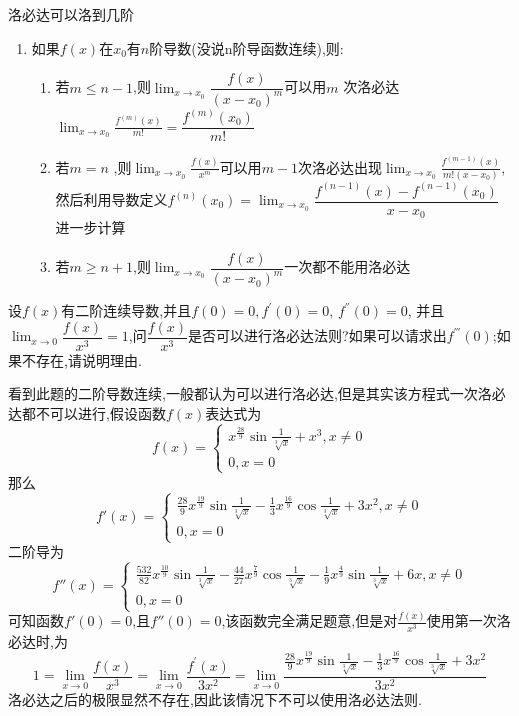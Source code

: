 \documentclass[12pt, a4paper, oneside, UTF8]{ctexbook}
\begin{document}
\begin{sloppypar}
\begin{criterion}{洛必达可以洛到几阶}{}
\begin{itemize}
\begin{enumerate}
\begin{enumerate}
                        \item 若$m>n$,则$\lim_{x\to x_0}\dfrac{f(x)}{\left(x-x_0\right)^m}$则一次都不能用洛必达.
                    \end{enumerate} 
                    \item 如果$f(x)$在$x_0$有$n$阶导数(没说n阶导函数连续),则:
                    \begin{enumerate}
                        \item 若$m{\leqslant}{n-1}$,则$\lim_{x\to x_0}\dfrac{f(x)}{\left(x-x_0\right)^m}$可以用$m$ 次洛必达$\lim_{x\to x_0}\frac{f^{(m)}\left(x\right)}{m!}=\dfrac{f^{(m)}\left(x_0\right)}{m!}$
                        \item 若$m=n$ ,则$\lim_{x\to x_0}\frac{f(x)}{x^m}$可以用$m-1$次洛必达出现$\lim_{x\to x_0}\frac{f^{(m-1)}\left(x\right)}{m!\left(x-x_0\right)}$,然后利用导数定义$f^{(n)}(x_0)=\lim_{x\to x_0}\dfrac{f^{(n-1)}\left(x\right)-f^{(n-1)}\left(x_0\right)}{x-x_0}$进一步计算
                        \item 若$m\geq n+1$,则$\lim_{x\to x_0}\dfrac{f(x)}{\left(x-x_0\right)^m}$一次都不能用洛必达
                    \end{enumerate}
            \end{enumerate}
        \end{itemize}
    \end{criterion}
    \begin{problem}
        设$f(x)$有二阶连续导数,并且$f(0){=}0, f^{\prime}(0){=}0$, $f^{''}(0){=}0$, 并且$\lim_{x\to0}\dfrac{f(x)}{x^3}=1$,问$\dfrac{f(x)}{x^3}$是否可以进行洛必达法则?如果可以请求出$f^{'''}(0)$;如果不存在,请说明理由.
    \end{problem}
    \begin{solution}
        看到此题的二阶导数连续,一般都认为可以进行洛必达,但是其实该方程式一次洛必达都不可以进行,假设函数$f(x)$表达式为$$f\left(x\right)=\begin{cases}x^{\frac{28}{9}}\sin\frac{1}{\sqrt[3]{x}}+x^3,x\neq0\\0,x=0\end{cases}$$那么$$f'\left(x\right)=\begin{cases}\frac{28}{9}x^{\frac{19}{9}}\sin\frac{1}{\sqrt[3]{x}}-\frac{1}{3}x^{\frac{16}{9}}\cos\frac{1}{\sqrt[3]{x}}+{3x^{2}},x\neq0\\0,x=0\end{cases}$$二阶导为$$f''(x)=\begin{cases}\frac{532}{82}x^{\frac{10}{9}}\sin\frac{1}{\sqrt[3]{x}}-\frac{44}{27}x^{\frac{7}{9}}\cos\frac{1}{\sqrt[3]{x}}-\frac{1}{9}x^{\frac{4}{9}}\sin\frac{1}{\sqrt[3]{x}}+6x,x\neq0\\0,x=0\end{cases}$$可知函数$f'(0)=0$,且$f''(0)=0$,该函数完全满足题意,但是对$\frac{f(x)}{x^3}$使用第一次洛必达时,为$$1=\lim_{x\to0}\frac{f\left(x\right)}{x^{3}}=\lim_{x\to0}\frac{f^{\prime}\left(x\right)}{3x^{2}}=\lim_{x\to0}\frac{\frac{28}9x^{\frac{19}9}\sin\frac1{\sqrt[3]{x}}-\frac13x^{\frac{16}9}\cos\frac1{\sqrt[3]{x}}+3x^2}{3x^{2}}$$洛必达之后的极限显然不存在,因此该情况下不可以使用洛必达法则.

\end{solution}
\end{sloppypar}
\end{document}
